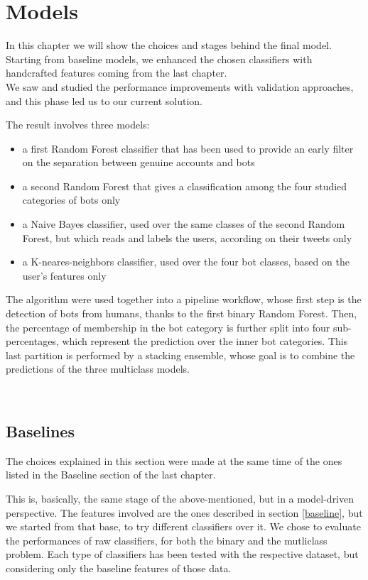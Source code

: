 \chapter{Models}
\label{capitolo5}
\thispagestyle{empty}

In this chapter we will show the choices and stages behind the final model.
Starting from baseline models, we enhanced the chosen classifiers with handcrafted features coming from the last chapter.\\
We saw and studied the performance improvements with validation approaches, and this phase led us to our current solution.

The result involves three models:
\begin{itemize}
	\item[\PencilRight] a first Random Forest classifier that has been used to provide an early filter on the separation between genuine accounts and bots
	\item[\PencilRight] a second Random Forest that gives a classification among the four studied categories of bots only
	\item[\PencilRight] a Naive Bayes classifier, used over the same classes of the second Random Forest, but which reads and labels the users, according on their tweets only
	\item[\PencilRight] a K-neares-neighbors classifier, used over the four bot classes, based on the user's features only
\end{itemize}
The algorithm were used together into a pipeline workflow, whose first step is the detection of bots from humans, thanks to the first binary Random Forest.
Then, the percentage of membership in the bot category is further split into four sub-percentages, which represent the prediction over the inner bot categories.
This last partition is performed by a stacking ensemble, whose goal is to combine the predictions of the three multiclass models.

\
\section{Baselines}
The choices explained in this section were made at the same time of the ones listed in the Baseline section of the last chapter.

This is, basically, the same stage of the above-mentioned, but in a model-driven perspective.
The features involved are the ones described in section \ref{baseline}, but we started from that base, to try different classifiers over it.
We chose to evaluate the performances of raw classifiers, for both the binary and the mutliclass problem.
Each type of classifiers has been tested with the respective dataset, but considering only the baseline features of those data.

